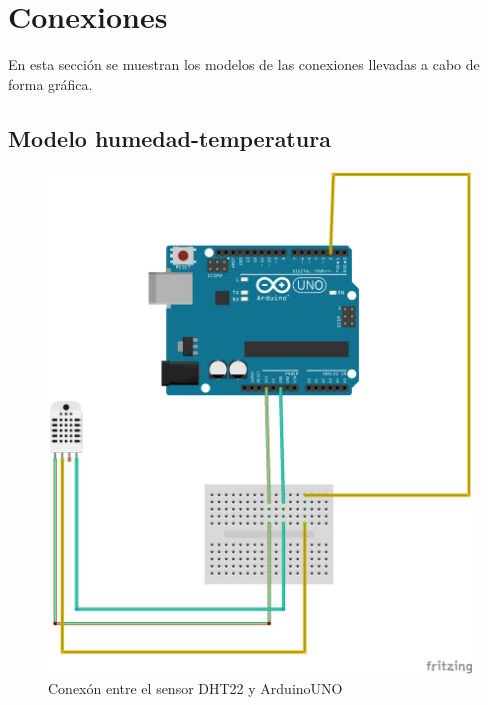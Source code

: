 \section{Conexiones}\label{sec:conexiones}

En esta secci\'on se muestran los modelos de las conexiones llevadas a
cabo de forma gr\'afica.

\subsection{Modelo humedad-temperatura}
\begin{center}
\begin{figure}[h]\label{fig:dht22}
\includegraphics{images/dht22_bb.png}
\caption{Conex\'on entre el sensor DHT22 y ArduinoUNO}
\end{figure}
\end{center}

